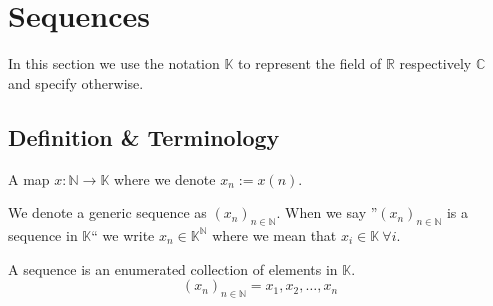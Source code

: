 \section{Sequences}
In this section we use the notation \(\mathbb{K}\) to represent the field of \(\mathbb{R}\) respectively \(\mathbb{C}\) and specify otherwise.

\subsection{Definition \& Terminology}
\begin{definition}[Sequence]
   A map \(x: \mathbb{N} \to \mathbb{K}\) where we denote \(x_n := x(n)\).
\end{definition}
\begin{remark}[Notation]
   We denote a generic sequence as \((x_n)_{n \in \mathbb{N}}\).
   When we say ''\((x_n)_{n \in \mathbb{N}}\) is a sequence in \(\mathbb{K}\)`` we write \(x_n \in \mathbb{K}^\mathbb{N}\) where we mean that \(x_i \in \mathbb{K}~\forall i\).
\end{remark}
\begin{remark}[Intuition]
   A sequence is an enumerated collection of elements in \(\mathbb{K}\).
   \[(x_n)_{n \in \mathbb{N}} = x_1, x_2, \ldots, x_n\]
\end{remark}

